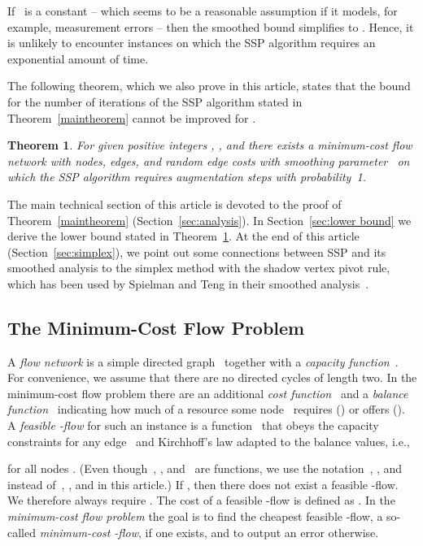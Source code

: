 \documentclass[11pt]{article}
\newtheorem{theorem}{Theorem}
\begin{document}
If~ is a constant -- which seems to be a reasonable assumption if it models, for example, measurement errors -- then the smoothed bound simplifies to . Hence, it is unlikely to encounter instances on which the SSP algorithm requires an exponential amount of time.





The following theorem, which we also prove in this article, states that the bound for the number of iterations of the SSP algorithm stated in Theorem~\ref{maintheorem} cannot be improved for . 

\begin{theorem}
\label{theorem:lower bound}
For given positive integers , , and  there exists a minimum-cost flow network with  nodes,  edges, and random edge costs with smoothing parameter~ on which the SSP algorithm requires  augmentation steps with probability~1.
\end{theorem}

The main technical section of this article is devoted to the proof of Theorem~\ref{maintheorem}
(Section~\ref{sec:analysis}). In Section~\ref{sec:lower bound} we derive the lower bound stated in Theorem~\ref{theorem:lower bound}.
At the end of this article (Section~\ref{sec:simplex}), we point out
some connections between SSP and its smoothed analysis
to the simplex method with the shadow vertex pivot rule, which has been used
by Spielman and Teng in their smoothed analysis~\cite{DBLP:journals/jacm/SpielmanT04}.

\subsection{The Minimum-Cost Flow Problem}

A \emph{flow network} is a simple directed graph~ together with a \emph{capacity function}~. For convenience, we assume that there are no directed cycles of length two. In the minimum-cost flow problem there are an additional \emph{cost function}~ and a \emph{balance function}~ indicating how much of a resource some node~ requires () or offers (). A \emph{feasible -flow} for such an instance is a function~ that obeys the capacity constraints  for any edge~ and Kirchhoff's law adapted to the balance values, i.e.,

for all nodes . (Even though~, , and~ are functions, we use the notation~, , and  instead of~, , and  in this article.) If , then there does not exist a feasible -flow. We therefore always require .
The cost of a feasible -flow is defined as . In the \emph{minimum-cost flow problem} the goal is to find the cheapest feasible -flow, a so-called \emph{minimum-cost -flow}, if one exists, and to output an error otherwise.
\end{document}
